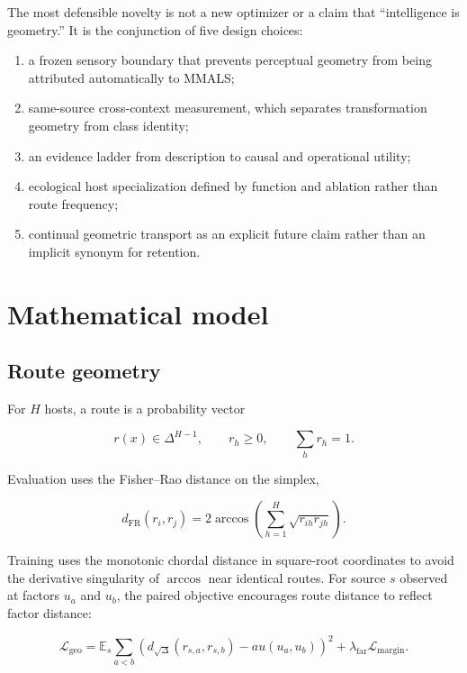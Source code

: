 \documentclass[11pt,a4paper]{article}
\newcommand{\E}{\mathbb{E}}
\newcommand{\loss}{\mathcal{L}}
\begin{document}
The most defensible novelty is not a new optimizer or a claim that ``intelligence is geometry.'' It is the conjunction of five design choices:

\begin{enumerate}
\item a frozen sensory boundary that prevents perceptual geometry from being attributed automatically to MMALS;
\item same-source cross-context measurement, which separates transformation geometry from class identity;
\item an evidence ladder from description to causal and operational utility;
\item ecological host specialization defined by function and ablation rather than route frequency;
\item continual geometric transport as an explicit future claim rather than an implicit synonym for retention.
\end{enumerate}

\section{Mathematical model}

\subsection{Route geometry}

For $H$ hosts, a route is a probability vector

\begin{equation}
 r(x) \in \Delta^{H-1}, \qquad r_h\ge 0, \qquad \sum_h r_h=1.
\end{equation}

Evaluation uses the Fisher--Rao distance on the simplex,

\begin{equation}
 d_{\mathrm{FR}}(r_i,r_j)
 =2\arccos\left(\sum_{h=1}^{H}\sqrt{r_{ih}r_{jh}}\right).
\end{equation}

Training uses the monotonic chordal distance in square-root coordinates to avoid the derivative singularity of $\arccos$ near identical routes. For source $s$ observed at factors $u_a$ and $u_b$, the paired objective encourages route distance to reflect factor distance:

\begin{equation}
 \loss_{\mathrm{geo}}
 = \E_s\sum_{a<b}
 \left(d_{\sqrt\Delta}(r_{s,a},r_{s,b})-	au(u_a,u_b)\right)^2
 + \lambda_{\mathrm{far}}\loss_{\mathrm{margin}}.
\end{equation}
\end{document}
